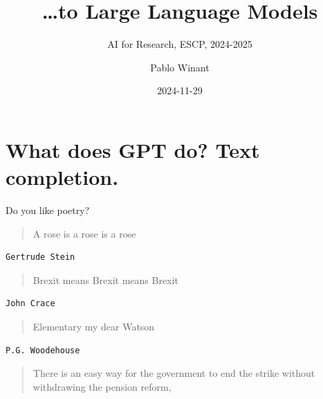\documentclass[
  ignorenonframetext,
]{beamer}
\title{\ldots to Large Language Models}
\subtitle{AI for Research, ESCP, 2024-2025}
\author{Pablo Winant}
\date{2024-11-29}
\begin{document}
\frame{\titlepage}


\section{What does GPT do? Text
completion.}\label{what-does-gpt-do-text-completion.}

\begin{frame}[fragile]{Do you like poetry?}
\label{do-you-like-poetry}
\pause

\begin{quote}
A rose is a rose is {a rose}
\end{quote}

\pause

\begin{verbatim}
Gertrude Stein
\end{verbatim}

\pause

\begin{quote}
Brexit means Brexit means {Brexit}
\end{quote}

\pause

\begin{verbatim}
John Crace
\end{verbatim}

\pause

\begin{quote}
Elementary my dear {Watson}
\end{quote}

\pause

\begin{verbatim}
P.G. Woodehouse
\end{verbatim}

\pause
\end{frame}

\begin{frame}{}
\label{section}
\begin{quote}
There is an easy way for the government to end the strike without
withdrawing the pension reform,
\end{quote}

\pause
\end{frame}

\end{document}
